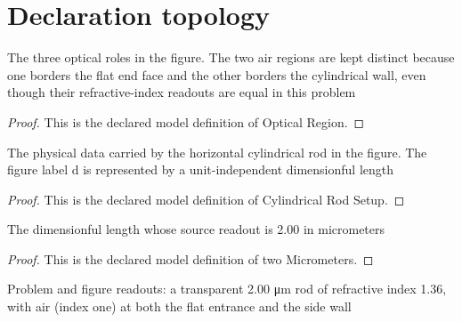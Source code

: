 \section{Declaration topology}
\begin{definition}
  \label{def:physics:phyx-mini-0010:phyxminiproblems-problemphyxmini0010-opticalregion}
  The three optical roles in the figure. The two air regions are kept distinct because one borders the flat end face and the other borders the cylindrical wall, even though their refractive-index readouts are equal in this problem
\end{definition}
\begin{proof}
  This is the declared model definition of Optical Region.
\end{proof}
\begin{definition}
  \label{def:physics:phyx-mini-0010:phyxminiproblems-problemphyxmini0010-cylindricalrodsetup}
  The physical data carried by the horizontal cylindrical rod in the figure. The figure label d is represented by a unit-independent dimensionful length
\end{definition}
\begin{proof}
  This is the declared model definition of Cylindrical Rod Setup.
\end{proof}
\begin{definition}
  \label{def:physics:phyx-mini-0010:phyxminiproblems-problemphyxmini0010-twomicrometers}
  The dimensionful length whose source readout is 2.00 in micrometers
\end{definition}
\begin{proof}
  This is the declared model definition of two Micrometers.
\end{proof}
\begin{definition}
  \label{def:physics:phyx-mini-0010:phyxminiproblems-problemphyxmini0010-cylindricalrodfigurereadouts}
  Problem and figure readouts: a transparent 2.00 μm rod of refractive index 1.36, with air (index one) at both the flat entrance and the side wall
\end{definition}
